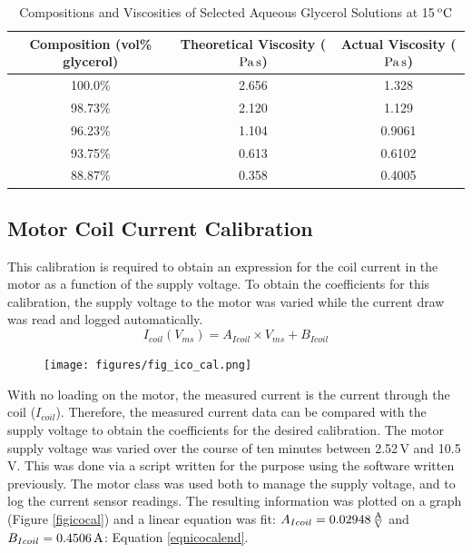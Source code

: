 \documentclass[twoside,a4]{report}
\begin{document}
	\newline
	\begin{table}
		\centering
		\caption{Compositions and Viscosities of Selected Aqueous Glycerol Solutions at 15$\,\rm^oC$}
		\label{tabreffluvisc}
		\begin{tabular}{| c | c | c |}
			\hline
			Composition (vol\% glycerol) & Theoretical Viscosity ($\rm Pa\,s$) & Actual Viscosity ($\rm Pa\,s$)\\
			\hline
			100.0\% & 2.656 & 1.328 \\
			98.73\% & 2.120 & 1.129 \\
			96.23\% & 1.104 & 0.9061 \\
			93.75\% & 0.613 & 0.6102 \\
			88.87\% & 0.358 & 0.4005 \\
			\hline
		\end{tabular}
	\end{table}
	
	\subsection*{Motor Coil Current Calibration}
	This calibration is required to obtain an expression for the coil current in the motor as a function of the supply voltage. To obtain the coefficients for this calibration, the supply voltage to the motor was varied while the current draw was read and logged automatically.
	\begin{equation}
	I_{coil} (V_{ms}) = A_{Icoil} \times V_{ms} + B_{Icoil}
	\label{eqnicocalmid}
	\end{equation}
	
	\begin{figure}[!htb]
		\centering
		\texttt{[image: figures/fig\_ico\_cal.png]}
		\caption{Coil Current Calibration Results}
		\label{figicocal}
		\begin{subfigure}{0.9\textwidth}
			\footnotesize 
		\end{subfigure}
	\end{figure}
	
	\noindent
	With no loading on the motor, the measured current is the current through the coil ($I_{coil}$). Therefore, the measured current data can be compared with the supply voltage to obtain the coefficients for the desired calibration. The motor supply voltage was varied over the course of ten minutes between 2.52\,V and 10.5\,V. This was done via a script written for the purpose using the software written previously. The motor class was used both to manage the supply voltage, and to log the current sensor readings. The resulting information was plotted on a graph (Figure \ref{figicocal}) and a linear equation was fit: $A_{Icoil} = 0.02948\,\rm\frac{A}{V}$ and $B_{Icoil} = 0.4506\,\rm A$: Equation \ref{eqnicocalend}.
	
\end{document}
